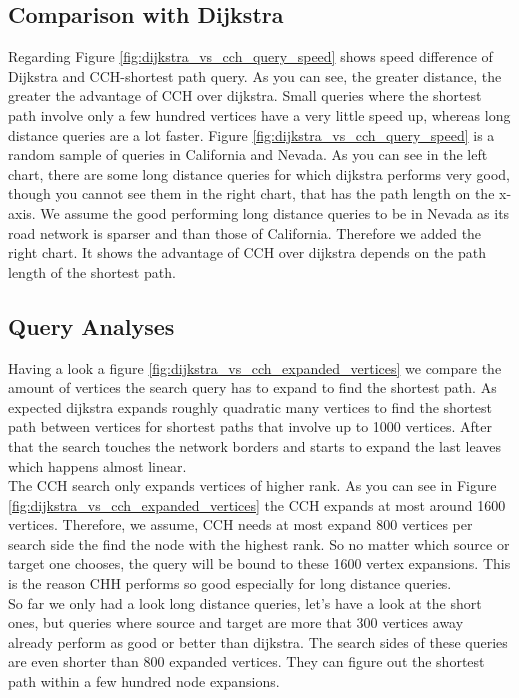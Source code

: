 \subsection{Comparison with Dijkstra}

Regarding Figure \ref{fig:dijkstra_vs_cch_query_speed} shows speed difference of Dijkstra and CCH-shortest path query. As you can see, the greater distance, the greater the advantage of CCH over dijkstra. Small queries where the shortest path involve only a few hundred vertices have a very little speed up,
whereas long distance queries are a lot faster. Figure \ref{fig:dijkstra_vs_cch_query_speed} is a random sample of queries in California and Nevada. As you can
see in the left chart, there are some long distance queries for which dijkstra performs very good, though you cannot see them in the right chart, that has the path 
length on the x-axis. We assume the good performing long distance queries to be in Nevada as its road network is sparser and than those of California. Therefore we added the right chart.
It shows the advantage of CCH over dijkstra depends on the path length of the shortest path.



\subsection{Query Analyses}

Having a look a figure \ref{fig:dijkstra_vs_cch_expanded_vertices} we compare the amount of vertices the search query has to expand to find the shortest path. As expected dijkstra expands roughly quadratic many vertices to find the shortest path between vertices for shortest paths that involve up to 1000 vertices.
After that the search touches the network borders and starts to expand the last leaves which happens almost linear.\\
The CCH search only expands vertices of higher rank. As you can see in Figure \ref{fig:dijkstra_vs_cch_expanded_vertices} the CCH expands at most around 1600 vertices. Therefore, we assume, CCH needs at most expand 800 vertices per search side the find the node with the highest rank. So no matter which source or target one chooses, the query will be bound to these 1600 vertex expansions.
This is the reason CHH performs so good especially for long distance queries.
\\
So far we only had a look long distance queries, let's have a look at the short ones, but queries where source and target are more that 300 vertices away already perform as good or better than dijkstra. The search sides of these queries are even shorter than 800 expanded vertices. They can figure out the shortest path within a few hundred node expansions.

